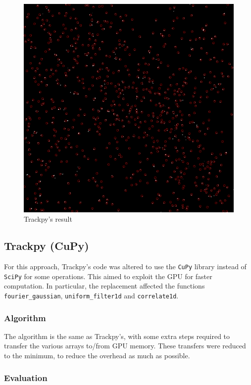 \begin{figure}
	\centerline{\includegraphics[width=\locateimgsize]{images/locate/trackpy.png}}
	\caption{\centering Trackpy's result}
	\label{fig:locate:trackpy}
\end{figure}

\subsection{Trackpy (CuPy)}

For this approach, Trackpy's code was altered to use the \texttt{CuPy} library instead of \texttt{SciPy} for some operations.
This aimed to exploit the GPU for faster computation.
In particular, the replacement affected the functions \texttt{fourier\_gaussian}, \texttt{uniform\_filter1d} and \texttt{correlate1d}.

\subsubsection{Algorithm}

The algorithm is the same as Trackpy's, with some extra steps required to transfer the various arrays to/from GPU memory.
These transfers were reduced to the minimum, to reduce the overhead as much as possible.

\subsubsection{Evaluation}

